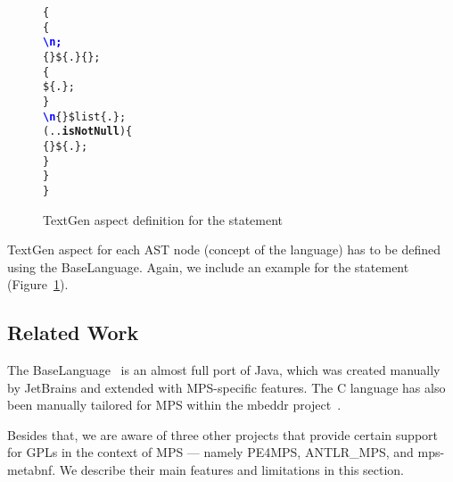 \begin{figure}[ht]
\centering
\begin{alltt}
\small
{}  \{
   \{
     \textcolor{blue}{\textbf{\textbackslash{}n;}}
     \{\} \$\{.\} \{\mpstgliteral{) \{}\};
     \{
       \$\{.\};
    \}
     \textcolor{blue}{\textbf{\textbackslash{}n}} \{\mpstgliteral{\}}\} \$list\{.\};
     (..\textbf{isNotNull}) \{
       \{ \} \$\{.\};
    \}
  \}
\}
\end{alltt}
\caption{TextGen aspect definition for the  statement}
\label{fig:if_statement_textgen}
\end{figure}

TextGen aspect for each AST node (concept of the language) has to be defined using the BaseLanguage.
Again, we include an example for the  statement (Figure~\ref{fig:if_statement_textgen}).

\subsection{Related Work}
\label{sect:RELATED}


The BaseLanguage~\cite{ref:BASELANG} is an almost full port of Java, which was created manually by JetBrains and extended with MPS-specific features.
The C language has also been manually tailored for MPS within the mbeddr project~\cite{ref:MBEDDR}.

Besides that, we are aware of three other projects that provide certain support for GPLs in the context of MPS --- namely PE4MPS, ANTLR{\_}MPS, and mps-metabnf.
We describe their main features and limitations in this section.



